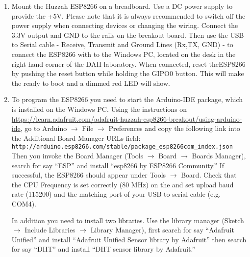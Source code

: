 \begin{enumerate}

\item Mount the Huzzah ESP8266 \microcontroller on a breadboard. 
Use a DC power supply to provide the +5V. 
Please note that it is always recommended to switch off the power supply when connecting devices or changing the wiring.
Connect the 3.3V output and GND to the rails on the breakout board. 
Then use the USB  to Serial cable - Receive, Transmit and Ground Lines (Rx,TX, GND) -
to connect the ESP8266 with to the Windows PC, 
located on the desk in the right-hand corner of the DAH laboratory. 
When connected, reset  theESP8266 by  pushing the
reset button while holding the GIPO0 button. 
This will make the \microcontroller ready to boot 
and a dimmed red LED will show.

\item To program the  ESP8266  you need to start the Arduino-IDE package, 
which is installed on the Windows PC. Using the instructions on
\url{https://learn.adafruit.com/adafruit-huzzah-esp8266-breakout/using-arduino-ide},
go to Arduino $\rightarrow$ File $\rightarrow$ Preferences and copy the following link into
the Additional Board Manager URLs field: 
\hspace*{5mm} {\tt http://arduino.esp8266.com/stable/package\_esp8266com\_index.json}\\
Then you invoke  the Board Manager (Tools $\rightarrow$ Board $\rightarrow$ Boards Manager),
search for say ``ESP'' and install ``esp8266 by ESP8266 Community.''
If successful, the  ESP8266 should appear under Tools $\rightarrow$ Board. 
Check that the CPU Frequency is set correctly (80 MHz) on the \microcontroller
and set upload baud rate (115200)  and the matching port of your USB to serial cable (e.g. COM4).

In addition you need to install two libraries.
Use the library manager (Sketch $\rightarrow$  Include Libraries $\rightarrow$ Library Manager), first  search for  say ``Adafruit Unified'' and install ``Adafruit Unified Sensor library by Adafruit'' then search for say ``DHT'' and install ``DHT sensor library by Adafruit.''



\end{enumerate}
